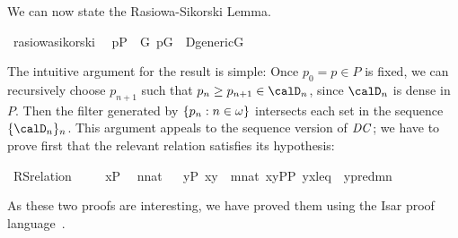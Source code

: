 We can now state the Rasiowa-Sikorski Lemma.
\begin{isabelle}%
\isamarkupfalse%
\ rasiowa{\isacharunderscore}sikorski{\isacharcolon}\isanewline
\ \ {\isachardoublequoteopen}p{\isasymin}P\ {\isasymLongrightarrow}\ {\isasymexists}G{\isachardot}\ p{\isasymin}G\ {\isasymand}\ D{\isacharunderscore}generic{\isacharparenleft}G{\isacharparenright}{\isachardoublequoteclose}
\end{isabelle}

The intuitive argument for the result is simple: Once $p_0=p\in P$ is
fixed, we can recursively choose $p_{n+1}$ such that 
$p_n \geq p_{n+1}\in \calD_n$, since $\calD_n$ is dense in $P$. Then
the filter generated by $\{p_n : n\in \omega\}$ intersects each set in
the sequence $\{\calD_n\}_n$. This argument appeals to the sequence
version of $\mathit{DC}$; we have to prove first that the relevant relation
satisfies its hypothesis:

\begin{isabelle}%
\isamarkupfalse%
\  RS{\isacharunderscore}relation{\isacharcolon}\isanewline
\ \ \isanewline
  {}{\isacharcolon}\ \ {\isachardoublequoteopen}x{\isasymin}P{\isachardoublequoteclose}\isanewline
   \isanewline
  {}{\isacharcolon}\ \ {\isachardoublequoteopen}n{\isasymin}nat{\isachardoublequoteclose}\isanewline
\ \ \isanewline
   {\isachardoublequoteopen}{\isasymexists}y{\isasymin}P{\isachardot}\ {\isasymlangle}x{\isacharcomma}y{\isasymrangle}\ {\isasymin}\ {\isacharparenleft}{\isasymlambda}m{\isasymin}nat{\isachardot}\ {\isacharbraceleft}{\isasymlangle}x{\isacharcomma}y{\isasymrangle}{\isasymin}P{\isacharasterisk}P{\isachardot}\ {\isasymlangle}y{\isacharcomma}x{\isasymrangle}{\isasymin}leq\ {\isasymand}\ y{\isasymin}{\isasymD}{\isacharbackquote}{\isacharparenleft}pred{\isacharparenleft}m{\isacharparenright}{\isacharparenright}{\isacharbraceright}{\isacharparenright}{\isacharbackquote}n{\isachardoublequoteclose}
\end{isabelle}
%
As these two proofs are interesting, we have proved them using the
Isar proof language~\cite{DBLP:conf/tphol/Wenzel99}.


